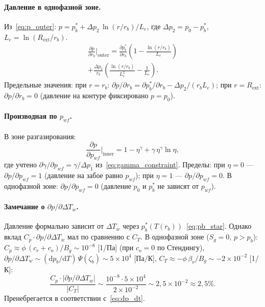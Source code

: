 \documentclass[12pt,a4paper]{article}
\newcommand{\dd}{\mathrm{d}}
\newcommand{\pp}{\partial}
\newcommand{\ext}{\mathrm{ext}}
\begin{document}
\paragraph{Давление в однофазной зоне.}
Из~\eqref{eq:p_outer}:
$p = p_b^* + \Delta p_2\,\ln(r/r_b)/L_e$,
где $\Delta p_2 = p_0 - p_b^*$, $L_e = \ln(R_\ext/r_b)$.
\begin{multline}\label{eq:dp_drb_outer}
  \frac{\pp p}{\pp r_b}\bigg|_\text{outer}
  = \frac{\pp p_b^*}{\pp r_b}
    \left(1 - \frac{\ln(r/r_b)}{L_e}\right) \\
    + \frac{\Delta p_2}{r_b}
    \left(
      \frac{\ln(r/r_b)}{L_e^2} - \frac{1}{L_e}
    \right).
\end{multline}
Предельные значения:
при $r = r_b$: $\pp p/\pp r_b = \pp p_b^*/\pp r_b
  - \Delta p_2/(r_b L_e)$;
при $r = R_\ext$: $\pp p/\pp r_b = 0$
(давление на контуре фиксировано $p = p_0$).

\paragraph{Производная по $p_{wf}$.}
В зоне разгазирования:
\begin{equation}\label{eq:dp_dpwf}
  \frac{\pp p}{\pp p_{wf}}\bigg|_\text{inner}
  = 1 - \eta^\gamma + \gamma\,\eta^\gamma\ln\eta,
\end{equation}
где учтено $\pp\gamma/\pp p_{wf} = \gamma/\Delta p_1$
из~\eqref{eq:gamma_constraint}.
Пределы: при $\eta = 0$ --- $\pp p/\pp p_{wf} = 1$
(давление на забое равно $p_{wf}$);
при $\eta = 1$ --- $\pp p/\pp p_{wf} = 0$.
В однофазной зоне: $\pp p/\pp p_{wf} = 0$
(давление $p_0$ и $p_b^*$ не зависят от $p_{wf}$).

\paragraph{Замечание о $\pp p/\pp\Delta T_w$.}
Давление формально зависит от $\Delta T_w$ через
$p_b^*(T(r_b))$~\eqref{eq:pb_star}. Однако вклад
$C_p\cdot\pp p/\pp\Delta T_w$ мал по сравнению с $C_T$.
В однофазной зоне ($S_g = 0$, $p > p_b$):
$C_p \approx \phi\,(c_r + c_o)/B_g \sim 10^{-8}$ [1/Па] (при $c_o = 0$ по Стендингу),
$\pp p/\pp\Delta T_w \sim (\dd p_b/\dd T)\,\Psi(\zeta_b)
  \sim 5\times 10^{4}$ [Па/К],
$C_T \approx -\phi\,\beta_o/B_g \sim -2\times 10^{-2}$ [1/К]:
\[
  \frac{C_p\cdot|\pp p/\pp\Delta T_w|}{|C_T|}
  \sim \frac{10^{-8}\cdot 5\times 10^4}{2\times 10^{-2}}
  \sim 2{,}5\times 10^{-2} \approx 2{,}5\%.
\]
Пренебрегается в соответствии с~\eqref{eq:dp_dt}.
\end{document}
